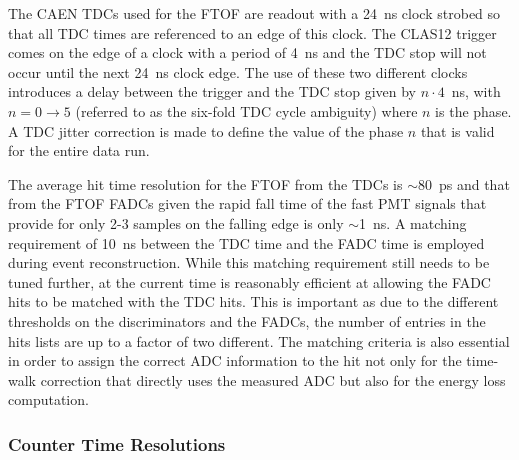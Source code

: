 \documentclass{elsart}
\begin{document}
The CAEN TDCs used for the FTOF are readout with a 24~ns clock strobed so that all TDC times are
referenced to an edge of this clock. The CLAS12 trigger comes on the edge of a clock with a period of
4~ns and the TDC stop will not occur until the next 24~ns clock edge. The use of these two different
clocks introduces a delay between the trigger and the TDC stop given by $n \cdot 4$~ns, with
$n = 0 \to 5$ (referred to as the six-fold TDC cycle ambiguity) where $n$ is the phase. A TDC jitter
correction is made to define the value of the phase $n$ that is valid for the entire data run.

The average hit time resolution for the FTOF from the TDCs is $\sim$80~ps and that from the FTOF
FADCs given the rapid fall time of the fast PMT signals that provide for only 2-3 samples on the falling
edge is only $\sim$1~ns. A matching requirement of 10~ns between the TDC time and the FADC time is
employed during event reconstruction. While this matching requirement still needs to be tuned further,
at the current time is reasonably efficient at allowing the FADC hits to be matched with the TDC hits.
This is important as due to the different thresholds on the discriminators and the FADCs, the number
of entries in the hits lists are up to a factor of two different. The matching criteria is also essential
in order to assign the correct ADC information to the hit not only for the time-walk correction that
directly uses the measured ADC but also for the energy loss computation.

\subsubsection{Counter Time Resolutions}
\label{tres-beam}
\end{document}
